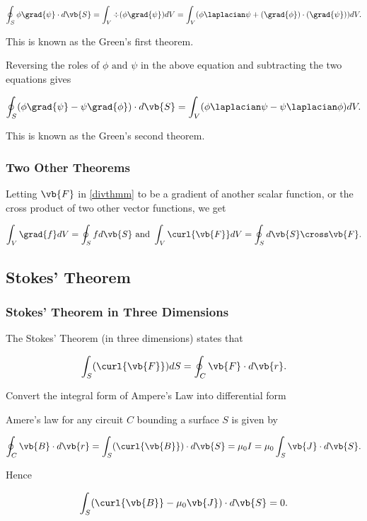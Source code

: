 \documentclass[english,a4paper,12pt]{report}
\begin{document}
\begin{equation}
	\oint_{S} \phi \grad{\psi } \cdot d\vb{S} = \int_{V}^{} \div{(\phi \grad{\psi } )}dV = \int_{V}^{} (\phi \laplacian \psi +(\grad{\phi } )\cdot (\grad{\psi } ))dV.   
\end{equation}

This is known as the Green's first theorem. 

Reversing the roles of \(\phi \text { and } \psi \) in the above equation and subtracting the two equations gives

\begin{equation}
	\oint_{S} (\phi \grad{\psi } - \psi \grad{\phi } ) \cdot d\vb{S}  = \int_{V}^{} (\phi \laplacian \psi - \psi \laplacian \phi ) dV. 
\end{equation}

This is known as the Green's second theorem.

\subsubsection{Two Other Theorems}

Letting \(\vb{F} \) in \cref{divthmm} to be a gradient of another scalar function, or the cross product of two other vector functions, we get 

\begin{equation}
	\int_{V}^{} \grad{f} dV = \oint_{S} fd\vb{S} \text { and } \int_{V}^{} \curl{\vb{F} } dV = \oint_{S} d\vb{S} \cross \vb{F} .     
\end{equation}

\subsection{Stokes' Theorem}

\subsubsection{Stokes' Theorem in Three Dimensions} 

The Stokes' Theorem (in three dimensions) states that 

\begin{equation} \label{stothmm} 
	\int_{S}^{} (\curl{\vb{F} } ) dS = \oint_{C} \vb{F} \cdot d\vb{r} .
\end{equation}

{Convert the integral form of Ampere's Law into differential form}
{Amere's law for any circuit \(C\) bounding a surface \(S\) is given by 

\begin{equation}
	\oint_{C} \vb{B} \cdot d\vb{r} = \int_{S}^{} (\curl{\vb{B} } ) \cdot d\vb{S} =  \mu _{0} I = \mu _{0}  \int_{S}^{} \vb{J} \cdot d\vb{S} .  
\end{equation}

Hence 

\begin{equation}
	\int_{S}^{} (\curl{\vb{B} } - \mu _{0} \vb{J}  ) \cdot d\vb{S} = 0.
\end{equation}




} 
\end{document}
